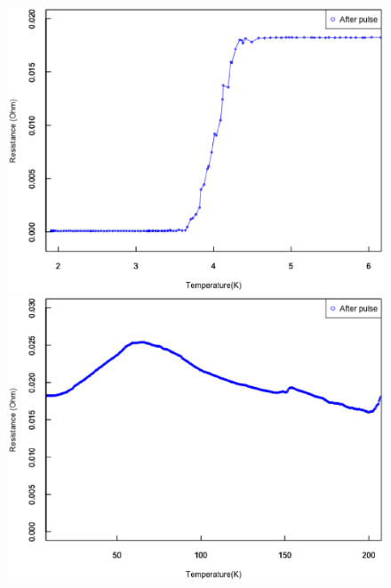 \begin{figure}[htb]
 \begin{minipage}{0.5\hsize}
    \begin{center}
   \includegraphics[width=\hsize]{results_discussions/181228_after_pulse.eps}
  \end{center}
  \caption{}
  \label{fig:181228_after_pulse}
 \end{minipage}
 \begin{minipage}{0.5\hsize}
     \begin{center}
   \includegraphics[width=\hsize]{results_discussions/181228_after_pulse2.eps}
  \end{center}
  \caption{}
  \label{fig:181228_after_pulse2}
   \end{minipage}
\end{figure}


